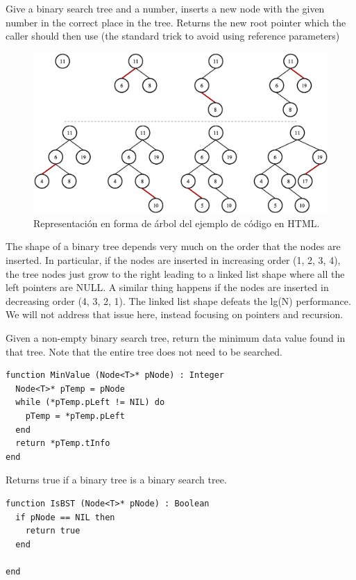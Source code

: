 Give a binary search tree and a number, inserts a new node with the given number in the correct place in the tree.  Returns the new root pointer which the caller should then use (the standard trick to avoid using reference parameters)


\begin{figure}[htpb!]
  \begin{center}
    \includegraphics[width=1.0\textwidth]{images/BSTInsert.eps}
  \end{center}
  \caption{Representación en forma de árbol del ejemplo de código en HTML.}
  \label{fig:BSTInsert}
\end{figure}

The shape of a binary tree depends very much on the order that the nodes are inserted. In particular, if the nodes are inserted in increasing order (1, 2, 3, 4), the tree nodes just grow to the right leading to a linked list shape where all the left pointers are NULL. A similar thing happens if the nodes are inserted in decreasing order (4, 3, 2, 1). The linked list shape defeats the lg(N) performance. We will not address that issue here, instead focusing on pointers and recursion.

Given a non-empty binary search tree, 
 return the minimum data value found in that tree. 
 Note that the entire tree does not need to be searched.

\begin{lstlisting}[upquote=true, language=pseudo]
function MinValue (Node<T>* pNode) : Integer
  Node<T>* pTemp = pNode
  while (*pTemp.pLeft != NIL) do
    pTemp = *pTemp.pLeft
  end
  return *pTemp.tInfo
end
\end{lstlisting}

Returns true if a binary tree is a binary search tree. 
\begin{lstlisting}[upquote=true, language=pseudo]
function IsBST (Node<T>* pNode) : Boolean
  if pNode == NIL then
    return true
  end
  
end
\end{lstlisting}


